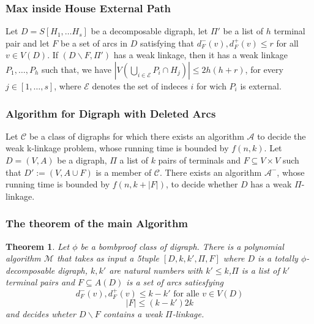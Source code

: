 \documentclass{beamer}
\newtheorem{thm}{Theorem}[section]
\begin{document}
\begin{frame}
    \frametitle{Max inside House External Path}
    \begin{lemma}
        Let $D=S[H_1,\dots H_s]$ be a decomposable digraph, let $\Pi'$ be a list of $h$ terminal pair and let $F$ be a set of arcs in $D$ satisfying that $d^-_F(v),d^+_F(v) \leq r$ for all $v \in V(D)$.
        If $(D\backslash F,\Pi')$ has a weak linkage, then it has a weak linkage $P_1,\dots , P_h$ such that, we have $|V\left( \bigcup_{i\in \mathcal{E}} P_i\cap H_j \right)|\leq 2h(h+r)$, for every $j\in [1,\dots,s]$, where $\mathcal{E}$ denotes the set of indeces $i$ for wich $P_i$ is external.
        \label{lemma:external}
    \end{lemma}
\end{frame}
\begin{frame}
    \frametitle{Algorithm for Digraph with Deleted Arcs}
    \begin{lemma}
        Let $\mathcal{C}$ be a class of digraphs for which there exists an algorithm $\mathcal{A}$ to decide the weak k-linkage problem, whose running time is bounded by $f(n,k)$. Let $D=(V,A)$ be a digraph, $\Pi$ a list of $k$ pairs of terminals and $F\subseteq V\times V$ such that $D':= (V,A\cup F)$ is a member of $\mathcal{C}$. There exists an algorithm  $\mathcal{A}^-$, whose running time is bounded by $f(n,k+|F|)$, to decide whether $D$ has a weak $\Pi$-linkage.
        \label{lemma:deletarcs}
    \end{lemma}
\end{frame}
\begin{frame}
    \frametitle{The theorem of the main Algorithm}
    \begin{thm}
        Let $\phi$ be a bombproof class of digraph. There is a polynomial algorithm $\mathcal{M}$ that takes as input a 5tuple $[D,k,k',\Pi,F]$ where $D$ is a totally $\phi$-decomposable digraph, $k,k'$ are natural numbers with $k'\leq k$,$\Pi$ is a list of $k'$ terminal pairs and $F\subseteq A(D)$ is a set of arcs satiesfying 
        \begin{equation}
            d_F^-(v),d_F^+(v)\leq k-k' \text{ for alle } v\in V(D)
        \end{equation}
        \begin{equation*}
            |F|\leq (k-k')2k
        \end{equation*}
        and decides wheter $D\backslash F$ contains a weak $\Pi$-linkage.
    \end{thm}
\end{frame}
\end{document}
